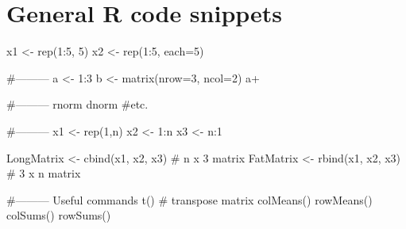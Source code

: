 \section{General R code snippets}
\begin{code}
 x1 <- rep(1:5, 5)
 x2 <- rep(1:5, each=5)

 #---------
 a <- 1:3
 b <- matrix(nrow=3, ncol=2)
 a+
 
 #---------
 rnorm
 dnorm
 #etc.

 #---------
 x1 <- rep(1,n)
 x2 <- 1:n
 x3 <- n:1
 
 LongMatrix <- cbind(x1, x2, x3) # n x 3 matrix
 FatMatrix  <- rbind(x1, x2, x3) # 3 x n matrix
 
 #--------- Useful commands
 t() # transpose matrix
 colMeans()
 rowMeans()
 colSums()
 rowSums()
 \end{code}

